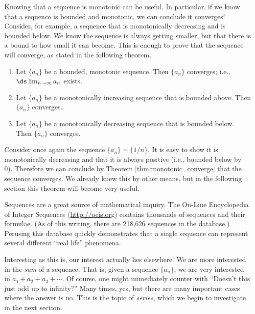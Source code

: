 Knowing that a sequence is monotonic can be useful. In particular, if we know that a sequence is bounded and monotonic, we can conclude it converges! Consider, for example, a sequence that is monotonically decreasing and is bounded below. We know the sequence is always getting smaller, but that there is a bound to how small it can become. This is enough to prove that the sequence will converge, as stated in the following theorem.

{\begin{enumerate}
\item		Let $\{a_n\}$ be a bounded, monotonic sequence. Then $\{a_n\}$ converges; i.e., $\ds \lim_{n \to\infty}a_n$ exists.
\item		Let $\{a_n\}$ be a monotonically increasing sequence that is bounded above. Then $\{a_n\}$ converges.
\item		Let $\{a_n\}$ be a monotonically decreasing sequence that is bounded below. Then $\{a_n\}$ converges.
\end{enumerate}
}

Consider once again the sequence $\{a_n\} = \{1/n\}$. It is easy to show it is monotonically decreasing and that it is always positive (i.e., bounded below by 0). Therefore we can conclude by Theorem \ref{thm:monotonic_converge} that the sequence converges. We already knew this by other means, but in the following section this theorem will become very useful.

Sequences are a great source of mathematical inquiry. The On-Line Encyclopedia of Integer Sequences (\url{http://oeis.org}) contains thousands of sequences and their formulae. (As of this writing, there are 218,626 sequences in the database.) Perusing this database quickly demonstrates that a single sequence can represent several different ``real life'' phenomena. 

Interesting as this is, our interest actually lies elsewhere. We are more interested in the \emph{sum} of a sequence. That is, given a sequence $\{a_n\}$, we are very interested in $a_1+a_2+a_3+\cdots$. Of course, one might immediately counter with ``Doesn't this just add up to infinity?'' Many times, yes, but there are many important cases where the answer is no. This is the topic of \emph{series}, which we begin to investigate in the next section.


